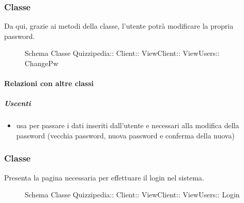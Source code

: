 \subsubsection{Classe }
Da qui, grazie ai metodi della classe, l'utente potrà modificare la propria password.
\begin{figure}[H]
\centering
\noindent{}
\caption[Schema Classe ChangePw]{Schema Classe Quizzipedia:: Client:: ViewClient:: ViewUsers:: ChangePw}
\end{figure}
\paragraph{Relazioni con altre classi}
\subparagraph{Uscenti}
\begin{itemize}
\item usa  per passare i dati inseriti dall'utente e necessari alla modifica della password (vecchia password, nuova password e conferma della nuova)
\end{itemize}
\subsubsection{Classe }
Presenta la pagina necessaria per effettuare il login nel sistema.
\begin{figure}[H]
\centering
\noindent{}
\caption[Schema Classe Login]{Schema Classe Quizzipedia:: Client:: ViewClient:: ViewUsers:: Login}
\end{figure}

